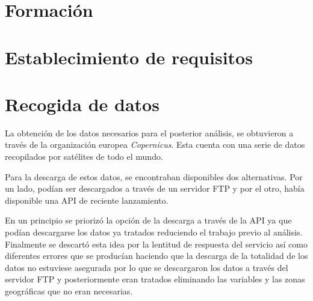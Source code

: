 \section{Formación}

\section{Establecimiento de requisitos}


\section{Recogida de datos}
La obtención de los datos necesarios para el posterior análisis, se obtuvieron a través de la organización europea \emph{Copernicus}. Esta cuenta con una serie de datos recopilados por satélites de todo el mundo.

Para la descarga de estos datos, se encontraban disponibles dos alternativas. Por un lado, podían ser descargados a través de un servidor FTP y por el otro, había disponible una API de reciente lanzamiento.

En un principio se priorizó la opción de la descarga a través de la API ya que podían descargarse los datos ya tratados reduciendo el trabajo previo al análisis. Finalmente se descartó esta idea por la lentitud de respuesta del servicio así como diferentes errores que se producían haciendo que la descarga de la totalidad de los datos no estuviese asegurada por lo que se descargaron los datos a través del servidor FTP y posteriormente eran tratados eliminando las variables y las zonas geográficas que no eran necesarias.